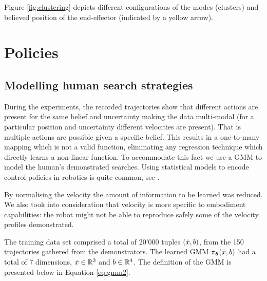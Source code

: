 Figure \ref{fig:clustering} depicts different configurations of the modes (clusters) and believed position of the end-effector (indicated by a yellow arrow).  





\section{Policies}\label{chap3:policies}

\subsection{Modelling human search strategies}\label{chap3:GMM_policy}

During the experiments, the recorded trajectories show that different actions are present for the same belief and uncertainty making the data multi-modal
(for a particular position and uncertainty different velocities are present). That is multiple actions are possible given a specific belief. 
This results in a one-to-many mapping which is not a valid function, eliminating any regression technique which directly learns a non-linear function. 
To accommodate this fact we use a GMM to model the human's demonstrated searches. Using statistical models to encode control policies in robotics is quite common, see \cite{Billard08chapter}. 

By normalising the velocity the amount of information to be learned was reduced. We also took into consideration that velocity is more 
specific to embodiment capabilities: the robot might not be able to reproduce safely some of the velocity profiles demonstrated. 

The training data set comprised a total of 20'000 tuples $(\dot{x},b)$, from the 150 trajectories gathered from the demonstrators. 
The learned GMM $\pi_{\boldsymbol{\theta}}(\dot{x},b)$ had a total of 7 dimensions, $\dot{x} \in \mathbb{R}^3$ and $b \in \mathbb{R}^4$. 
The definition of the GMM is presented below in Equation \ref{eq:gmm2}.

